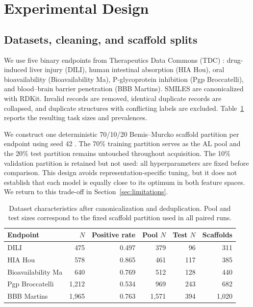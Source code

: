 \documentclass[twoside,11pt]{article}
\begin{document}
\section{Experimental Design}
\subsection{Datasets, cleaning, and scaffold splits}
We use five binary endpoints from Therapeutics Data Commons (TDC) \citep{huang2021tdc}: drug-induced liver injury (DILI), human intestinal absorption (HIA Hou), oral bioavailability (Bioavailability Ma), P-glycoprotein inhibition (Pgp Broccatelli), and blood--brain barrier penetration (BBB Martins). SMILES are canonicalized with RDKit. Invalid records are removed, identical duplicate records are collapsed, and duplicate structures with conflicting labels are excluded. Table~\ref{tab:data} reports the resulting task sizes and prevalences.

We construct one deterministic 70/10/20 Bemis--Murcko scaffold partition per endpoint using seed 42 \citep{bemis1996frameworks}. The 70\% training partition serves as the AL pool and the 20\% test partition remains untouched throughout acquisition. The 10\% validation partition is retained but not used: all hyperparameters are fixed before comparison. This design avoids representation-specific tuning, but it does not establish that each model is equally close to its optimum in both feature spaces. We return to this trade-off in Section~\ref{sec:limitations}.

\begin{table}[t]
\centering
\small
\caption{Dataset characteristics after canonicalization and deduplication. Pool and test sizes correspond to the fixed scaffold partition used in all paired runs.}
\label{tab:data}
\begin{tabular}{lrrrrr}
\toprule
Endpoint & $N$ & Positive rate & Pool $N$ & Test $N$ & Scaffolds \\
\midrule
DILI & 475 & 0.497 & 379 & 96 & 311 \\
HIA Hou & 578 & 0.865 & 461 & 117 & 385 \\
Bioavailability Ma & 640 & 0.769 & 512 & 128 & 440 \\
Pgp Broccatelli & 1,212 & 0.534 & 969 & 243 & 682 \\
BBB Martins & 1,965 & 0.763 & 1,571 & 394 & 1,020 \\
\bottomrule
\end{tabular}
\end{table}
\end{document}
